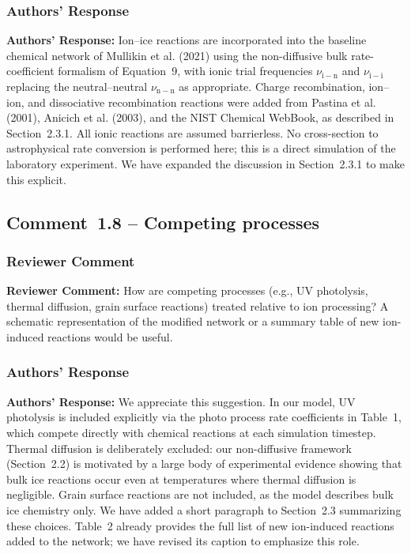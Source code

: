 \documentclass[12pt]{article}
\newcommand{\reviewlabel}{\textbf{\textcolor{commentframe}{Reviewer Comment:}}}
\newcommand{\responselabel}{\textbf{\textcolor{responseframe}{Authors' Response:}}}
\begin{document}
\subsubsection{Authors' Response}
\begin{responsebox}
\responselabel{} Ion--ice reactions are incorporated into the baseline
chemical network of Mullikin et al. (2021) using the non-diffusive bulk
rate-coefficient formalism of Equation~9, with ionic trial frequencies
$\nu_\mathrm{i-n}$ and $\nu_\mathrm{i-i}$ replacing the neutral--neutral
$\nu_\mathrm{n-n}$ as appropriate. Charge recombination, ion--ion, and
dissociative recombination reactions were added from  Pastina et al. (2001), Anicich et al. (2003), and the NIST Chemical WebBook, as described in
Section~2.3.1. All ionic reactions are assumed barrierless. No cross-section
to astrophysical rate conversion is performed here; this is a direct simulation of the laboratory experiment. We have expanded the discussion in Section~2.3.1 to make this explicit.
\end{responsebox}

\subsection{Comment~1.8 -- Competing processes}

\subsubsection{Reviewer Comment}
\begin{reviewerbox}
\reviewlabel{} How are competing processes (e.g., UV photolysis, thermal
diffusion, grain surface reactions) treated relative to ion processing? A
schematic representation of the modified network or a summary table of new
ion-induced reactions would be useful.
\end{reviewerbox}

\subsubsection{Authors' Response}
\begin{responsebox}
\responselabel{} We appreciate this suggestion. In our model, UV photolysis
is included explicitly via the photo process rate coefficients in Table~1,
which compete directly with chemical reactions at each simulation timestep.
Thermal diffusion is deliberately excluded: our non-diffusive framework
(Section~2.2) is motivated by a large body of experimental evidence showing
that bulk ice reactions occur even at temperatures where thermal diffusion is
negligible. Grain surface reactions are not included, as the model describes
bulk ice chemistry only. We have added a short paragraph to Section~2.3
summarizing these choices. Table~2 already provides the full list of new
ion-induced reactions added to the network; we have revised its caption to
emphasize this role.
\end{responsebox}
\end{document}
